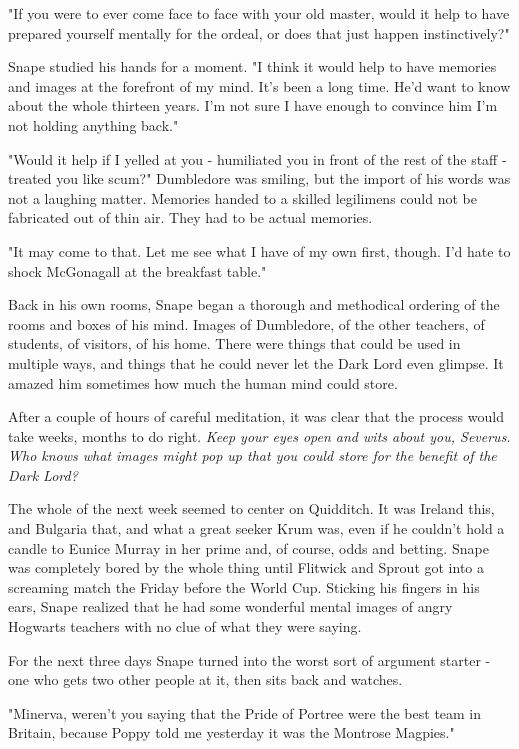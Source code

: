 "If you were to ever come face to face with your old master, would it help to have prepared yourself mentally for the ordeal, or does that just happen instinctively?"

Snape studied his hands for a moment. "I think it would help to have memories and images at the forefront of my mind. It's been a long time. He'd want to know about the whole thirteen years. I'm not sure I have enough to convince him I'm not holding anything back."

"Would it help if I yelled at you - humiliated you in front of the rest of the staff - treated you like scum?" Dumbledore was smiling, but the import of his words was not a laughing matter. Memories handed to a skilled legilimens could not be fabricated out of thin air. They had to be actual memories.

"It may come to that. Let me see what I have of my own first, though. I'd hate to shock McGonagall at the breakfast table."

Back in his own rooms, Snape began a thorough and methodical ordering of the rooms and boxes of his mind. Images of Dumbledore, of the other teachers, of students, of visitors, of his home. There were things that could be used in multiple ways, and things that he could never let the Dark Lord even glimpse. It amazed him sometimes how much the human mind could store.

After a couple of hours of careful meditation, it was clear that the process would take weeks, months to do right. \emph{Keep your eyes open and wits about you, Severus. Who knows what images might pop up that you could store for the benefit of the Dark Lord?}

The whole of the next week seemed to center on Quidditch. It was Ireland this, and Bulgaria that, and what a great seeker Krum was, even if he couldn't hold a candle to Eunice Murray in her prime and, of course, odds and betting. Snape was completely bored by the whole thing until Flitwick and Sprout got into a screaming match the Friday before the World Cup. Sticking his fingers in his ears, Snape realized that he had some wonderful mental images of angry Hogwarts teachers with no clue of what they were saying.

For the next three days Snape turned into the worst sort of argument starter - one who gets two other people at it, then sits back and watches.

"Minerva, weren't you saying that the Pride of Portree were the best team in Britain, because Poppy told me yesterday it was the Montrose Magpies."

